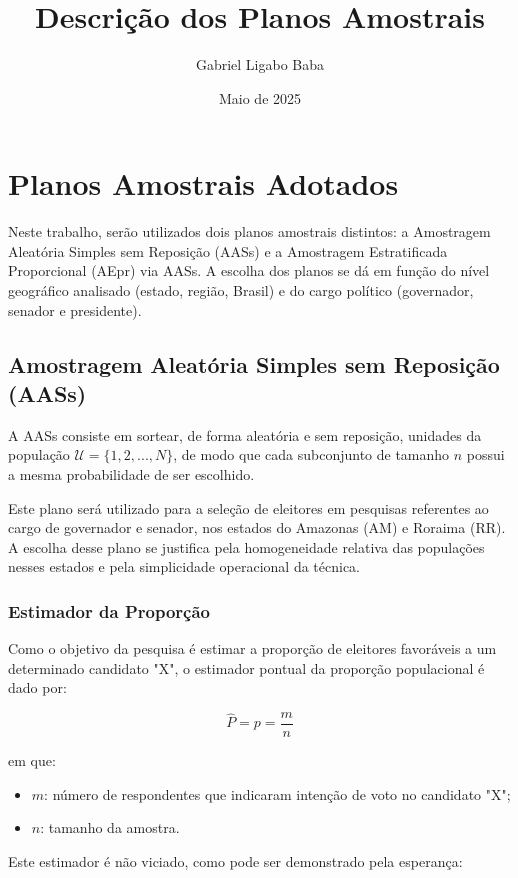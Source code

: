 \documentclass{article}
\title{Descrição dos Planos Amostrais}
\author{Gabriel Ligabo Baba}
\date{Maio de 2025}
\begin{document}
\maketitle

\section*{Planos Amostrais Adotados}

Neste trabalho, serão utilizados dois planos amostrais distintos: a Amostragem Aleatória Simples sem Reposição (AASs) e a Amostragem Estratificada Proporcional (AEpr) via AASs.
A escolha dos planos se dá em função do nível geográfico analisado (estado, região, Brasil) e do cargo político (governador, senador e presidente).

\subsection*{Amostragem Aleatória Simples sem Reposição (AASs)}

A AASs consiste em sortear, de forma aleatória e sem reposição, unidades da população $\mathcal{U} = \{1, 2, ..., N\}$, de modo que cada subconjunto de tamanho $n$ possui a mesma probabilidade de ser escolhido. 

Este plano será utilizado para a seleção de eleitores em pesquisas referentes ao cargo de governador e senador, nos estados do Amazonas (AM) e Roraima (RR). 
A escolha desse plano se justifica pela homogeneidade relativa das populações nesses estados e pela simplicidade operacional da técnica.

\subsubsection*{Estimador da Proporção}

Como o objetivo da pesquisa é estimar a proporção de eleitores favoráveis a um determinado candidato "X", o estimador pontual da proporção populacional é dado por:

\[
\hat{P} = p = \frac{m}{n}
\]

em que:
\begin{itemize}
    \item $m$: número de respondentes que indicaram intenção de voto no candidato "X";
    \item $n$: tamanho da amostra.
\end{itemize}

Este estimador é não viciado, como pode ser demonstrado pela esperança:
\end{document}
